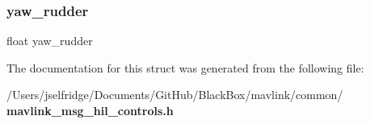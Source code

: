 \mbox{\label{struct____mavlink__hil__controls__t_a474f503b1924a59e5e7ab039463b97c0}} 
\subsubsection{yaw\+\_\+rudder}
{\footnotesize\ttfamily float yaw\+\_\+rudder}



The documentation for this struct was generated from the following file\+:\begin{DoxyCompactItemize}
\item 
/\+Users/jselfridge/\+Documents/\+Git\+Hub/\+Black\+Box/mavlink/common/\textbf{ mavlink\+\_\+msg\+\_\+hil\+\_\+controls.\+h}\end{DoxyCompactItemize}
